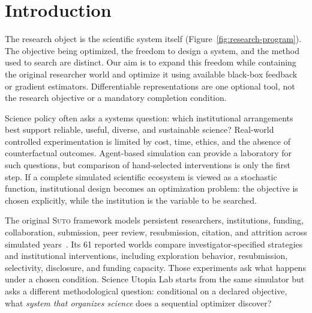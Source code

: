 \documentclass{article}
\newcommand{\suto}{\textsc{Suto}}
\begin{document}
\section{Introduction}



The research object is the scientific system itself
(Figure~\ref{fig:research-program}). The objective being optimized, the
freedom to design a system, and the method used to search are distinct.
Our aim is to expand this freedom while containing the original researcher
world and optimize it using available black-box feedback or gradient
estimators. Differentiable representations are one optional tool, not the
research objective or a mandatory completion condition.

Science policy often asks a systems question: which institutional arrangements best support reliable, useful, diverse, and sustainable science? Real-world controlled experimentation is limited by cost, time, ethics, and the absence of counterfactual outcomes. Agent-based simulation can provide a laboratory for such questions, but comparison of hand-selected interventions is only the first step. If a complete simulated scientific ecosystem is viewed as a stochastic function, institutional design becomes an optimization problem: the objective is chosen explicitly, while the institution is the variable to be searched.

The original \suto{} framework models persistent researchers, institutions, funding, collaboration, submission, peer review, resubmission, citation, and attrition across simulated years~\citep{jin2026scienceutopia}. Its 61 reported worlds compare investigator-specified strategies and institutional interventions, including exploration behavior, resubmission, selectivity, disclosure, and funding capacity. Those experiments ask what happens under a chosen condition. Science Utopia Lab starts from the same simulator but asks a different methodological question: conditional on a declared objective, what \emph{system that organizes science} does a sequential optimizer discover?
\end{document}
